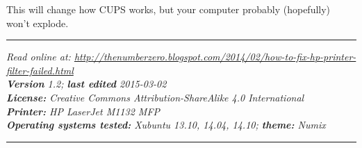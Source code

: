 \documentclass[12pt, a4paper]{article}
\begin{document}
This will change how CUPS works, but your computer probably (hopefully) won't explode.














\newpage
\vspace{4cm}
\hrule
\noindent \center \emph{Read online at: \url{http://thenumberzero.blogspot.com/2014/02/how-to-fix-hp-printer-filter-failed.html}\\
\textbf{Version} 1.2; \textbf{last edited} 2015-03-02\\
\textbf{License:} Creative Commons Attribution-ShareAlike 4.0 International\\
\textbf{Printer:} HP LaserJet M1132 MFP\\
\textbf{Operating systems tested:} Xubuntu 13.10, 14.04, 14.10; \textbf{theme:} Numix}
\vspace{1em}
\hrule
\end{document}
